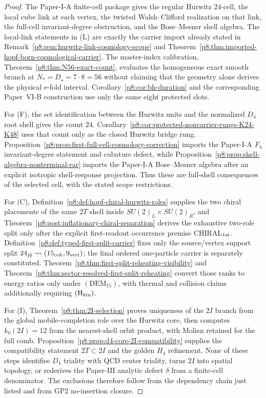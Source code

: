 \documentclass[12pt,a4paper]{article}
\begin{document}
\begin{proof}
The Paper-I-A finite-cell package gives the regular Hurwitz $24$-cell, the local cube link at each vertex, the twisted Walsh--Clifford realization on that link, the full-cell invariant-degree obstruction, and the Bose--Mesner shell algebra.  The local-link statements in \textup{(L)} are exactly the carrier import already stated in Remark~\ref{p8:rem:hurwitz-link-cosmology-scope} and Theorem~\ref{p8:thm:imported-hopf-born-cosmological-carrier}.  The master-index calibration, Theorem~\ref{p8:thm:N56-exact-count}, evaluates the homogeneous exact smooth branch at $N_*=D_\star=7\cdot8=56$ without claiming that the geometry alone derives the physical e-fold interval.  Corollary~\ref{p8:cor:bh-duration} and the corresponding Paper~VI-B construction use only the same eight protected slots.

For \textup{(F)}, the set identification between the Hurwitz units and the normalized $D_4$ root shell gives the count $24$.  Corollary~\ref{p8:cor:protected-noncarrier-rungs-K24-K48} uses that count only as the closed Hurwitz bridge rung.  Proposition~\ref{p8:prop:first-full-cell-cosmology-correction} imports the Paper-I-A $F_4$ invariant-degree statement and cubature defect, while Proposition~\ref{p8:prop:shell-algebra-nonterminal-rar} imports the Paper-I-A Bose--Mesner algebra after an explicit isotropic shell-response projection.  Thus these are full-shell consequences of the selected cell, with the stated scope restrictions.

For \textup{(C)}, Definition~\ref{p8:def:hopf-chiral-hurwitz-roles} supplies the two chiral placements of the same $2T$ shell inside $SU(2)_L\times SU(2)_R$, and Theorem~\ref{p8:post:inflationary-chiral-separation} derives the exhaustive two-role split only after the explicit first-readout occurrence premise \textsc{CHIRAL$_{1\rm st}$}.  Definition~\ref{p8:def:typed-first-split-carrier} fixes only the source/vertex support split $24_{\bar H}\rightsquigarrow(15_{\rm coh},9_{\rm vert})$; the final ordered one-particle carrier is separately constituted.  Theorem~\ref{p8:thm:first-split-reheating-visibility} and Theorem~\ref{p8:thm:sector-resolved-first-split-reheating} convert those ranks to energy ratios only under \((\mathrm{DEM}_{15})\), with thermal and collision claims additionally requiring \((\mathrm H_{\rm kin})\).

For \textup{(I)}, Theorem~\ref{p8:thm:2I-selection} proves uniqueness of the
$2I$ branch from the global mobile-completion role over the Hurwitz core,
then computes $k_0(2I)=12$ from the nearest-shell orbit product, with Molien
retained for the full comb.
Proposition~\ref{p8:prop:d4-core-2I-compatibility} supplies the compatibility
statement $2T\subset2I$ and the golden $H_4$ refinement.  None of these steps
identifies $D_4$ triality with QCD center triality, turns $2I$ into spatial
topology, or rederives the Paper-III analytic defect $\delta$ from a
finite-cell denominator.  The exclusions therefore follow from the
dependency chain just listed and from GP2 no-insertion closure.
\end{proof}
\end{document}
